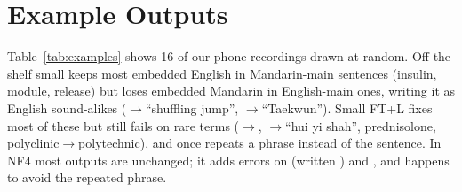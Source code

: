 \section{Example Outputs}
\label{sec:examples}

Table~\ref{tab:examples} shows 16 of our phone recordings drawn at random. Off-the-shelf small keeps most embedded English in Mandarin-main sentences (insulin, module, release) but loses embedded Mandarin in English-main ones, writing it as English sound-alikes ($\rightarrow$``shuffling jump'', $\rightarrow$``Taekwun''). Small FT+L fixes most of these but still fails on rare terms ($\rightarrow$, $\rightarrow$``hui yi shah'', prednisolone, polyclinic$\rightarrow$polytechnic), and once repeats a phrase instead of the sentence. In NF4 most outputs are unchanged; it adds errors on  (written ) and , and happens to avoid the repeated phrase.



